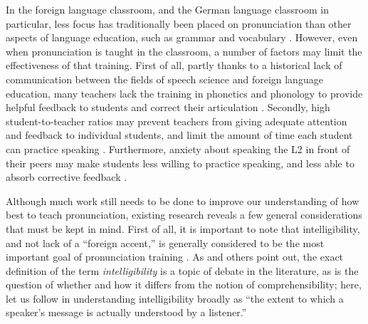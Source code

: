 In the foreign language classroom, and the German language classroom in particular, less focus has traditionally been placed on pronunciation than other aspects of language education, such as grammar and vocabulary %
\citep{Hirschfeld2007}.
However, even when pronunciation is taught in the classroom, a number of factors may limit the effectiveness of that training. %
First of all, partly thanks to a historical lack of communication between the fields of speech science and foreign language education, many teachers lack the training in phonetics and phonology to provide helpful feedback to students and correct their articulation \citep{Derwing2005,Hirschfeld2007}. Secondly, high student-to-teacher ratios may prevent teachers from giving adequate attention and feedback to individual students, and limit the amount of time each student can practice speaking \citep{Neri2002}. Furthermore, anxiety about speaking the L2 in front of their peers may make students less willing to practice speaking, and less able to absorb corrective feedback \citep{Neri2002}. 




Although much work still needs to be done to improve our understanding of how best to teach pronunciation, existing research reveals a few general considerations that must be kept in mind.
	First of all, it is important to note that 
intelligibility, and not lack of a ``foreign accent,'' is generally considered to be the most important goal of pronunciation training \citep{Munro1999,Neri2002,Derwing2005,Field2005,Witt2012}. %
As \textcite{Field2005} and others point out, the exact definition of the term \textit{intelligibility} is a topic of debate in the literature, as is the question of whether and how it differs from the notion of comprehensibility; 
here, let us follow \textcite[p.~289]{Munro1999} in understanding intelligibility broadly as ``the extent to which a speaker’s message is actually understood by a listener.'' 
	

